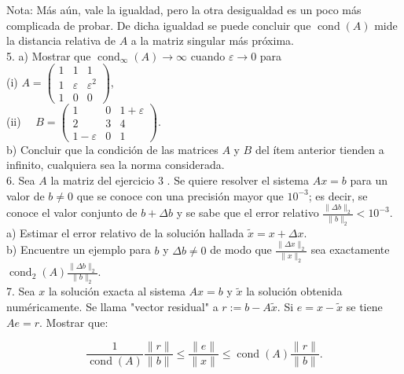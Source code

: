 \documentclass[10pt]{article}
\begin{document}
Nota: Más aún, vale la igualdad, pero la otra desigualdad es un poco más complicada de probar. De dicha igualdad se puede concluir que $\operatorname{cond}(A)$ mide la distancia relativa de $A$ a la matriz singular más próxima.\\
5. a) Mostrar que $\operatorname{cond}_{\infty}(A) \rightarrow \infty$ cuando $\varepsilon \rightarrow 0$ para\\
(i) $A=\left(\begin{array}{ccc}1 & 1 & 1 \\ 1 & \varepsilon & \varepsilon^{2} \\ 1 & 0 & 0\end{array}\right)$,\\
(ii) $\quad B=\left(\begin{array}{ccc}1 & 0 & 1+\varepsilon \\ 2 & 3 & 4 \\ 1-\varepsilon & 0 & 1\end{array}\right)$.\\
b) Concluir que la condición de las matrices $A$ y $B$ del ítem anterior tienden a infinito, cualquiera sea la norma considerada.\\
6. Sea $A$ la matriz del ejercicio 3 . Se quiere resolver el sistema $A x=b$ para un valor de $b \neq 0$ que se conoce con una precisión mayor que $10^{-3}$; es decir, se conoce el valor conjunto de $b+\Delta b$ y se sabe que el error relativo $\frac{\|\Delta b\|_{2}}{\|b\|_{2}}<10^{-3}$.\\
a) Estimar el error relativo de la solución hallada $\tilde{x}=x+\Delta x$.\\
b) Encuentre un ejemplo para $b$ y $\Delta b \neq 0$ de modo que $\frac{\|\Delta x\|_{2}}{\|x\|_{2}}$ sea exactamente $\operatorname{cond}_{2}(A) \frac{\|\Delta b\|_{2}}{\|b\|_{2}}$.\\
7. Sea $x$ la solución exacta al sistema $A x=b$ y $\tilde{x}$ la solución obtenida numéricamente. Se llama "vector residual" a $r:=b-A \tilde{x}$. Si $e=x-\tilde{x}$ se tiene $A e=r$. Mostrar que:

$$
\frac{1}{\operatorname{cond}(A)} \frac{\|r\|}{\|b\|} \leq \frac{\|e\|}{\|x\|} \leq \operatorname{cond}(A) \frac{\|r\|}{\|b\|} .
$$
\end{document}
